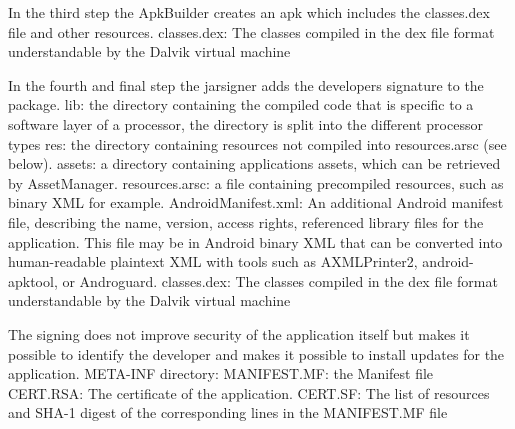 In the third step the ApkBuilder creates an \gls{apk} which includes the classes.dex file and other resources.
classes.dex: The classes compiled in the dex file format understandable by the Dalvik virtual machine

In the fourth and final step the jarsigner adds the developers signature to the package.
lib: the directory containing the compiled code that is specific to a software layer of a processor, the directory is split into the different processor types
res: the directory containing resources not compiled into resources.arsc (see below).
assets: a directory containing applications assets, which can be retrieved by AssetManager.
resources.arsc: a file containing precompiled resources, such as binary XML for example.
AndroidManifest.xml: An additional Android manifest file, describing the name, version, access rights, referenced library files for the application. This file may be in Android binary XML that can be converted into human-readable plaintext XML with tools such as AXMLPrinter2, android-apktool, or Androguard.
classes.dex: The classes compiled in the dex file format understandable by the Dalvik virtual machine


The signing does not improve security of the application itself but makes it possible to identify the developer and makes it possible to install updates for the application.
META-INF directory:
    MANIFEST.MF: the Manifest file
    CERT.RSA: The certificate of the application.
    CERT.SF: The list of resources and SHA-1 digest of the corresponding lines in the MANIFEST.MF file







